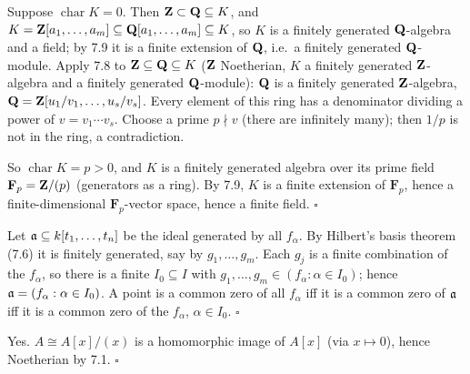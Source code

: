 \documentclass[11pt]{article}
\begin{document}
\pf
Suppose $\operatorname{char}K=0$. Then $\mathbf Z\subset\mathbf Q\subseteq K$, and $K=\mathbf Z[a_1,\dots,a_m]\subseteq\mathbf Q[a_1,\dots,a_m]\subseteq K$, so $K$ is a finitely generated $\mathbf Q$-algebra and a field; by 7.9 it is a finite extension of $\mathbf Q$, i.e.\ a finitely generated $\mathbf Q$-module. Apply 7.8 to $\mathbf Z\subseteq\mathbf Q\subseteq K$ ($\mathbf Z$ Noetherian, $K$ a finitely generated $\mathbf Z$-algebra and a finitely generated $\mathbf Q$-module): $\mathbf Q$ is a finitely generated $\mathbf Z$-algebra, $\mathbf Q=\mathbf Z[u_1/v_1,\dots,u_s/v_s]$. Every element of this ring has a denominator dividing a power of $v=v_1\cdots v_s$. Choose a prime $p\nmid v$ (there are infinitely many); then $1/p$ is not in the ring, a contradiction.

So $\operatorname{char}K=p>0$, and $K$ is a finitely generated algebra over its prime field $\mathbf F_p=\mathbf Z/(p)$ (generators as a ring). By 7.9, $K$ is a finite extension of $\mathbf F_p$, hence a finite-dimensional $\mathbf F_p$-vector space, hence a finite field. \hfill$\square$

\pf
Let $\mathfrak a\subseteq k[t_1,\dots,t_n]$ be the ideal generated by all $f_\alpha$. By Hilbert's basis theorem (7.6) it is finitely generated, say by $g_1,\dots,g_m$. Each $g_j$ is a finite combination of the $f_\alpha$, so there is a finite $I_0\subseteq I$ with $g_1,\dots,g_m\in(f_\alpha:\alpha\in I_0)$; hence $\mathfrak a=(f_\alpha:\alpha\in I_0)$. A point is a common zero of all $f_\alpha$ iff it is a common zero of $\mathfrak a$ iff it is a common zero of the $f_\alpha$, $\alpha\in I_0$. \hfill$\square$

\pf
Yes. $A\cong A[x]/(x)$ is a homomorphic image of $A[x]$ (via $x\mapsto0$), hence Noetherian by 7.1. \hfill$\square$
\end{document}
